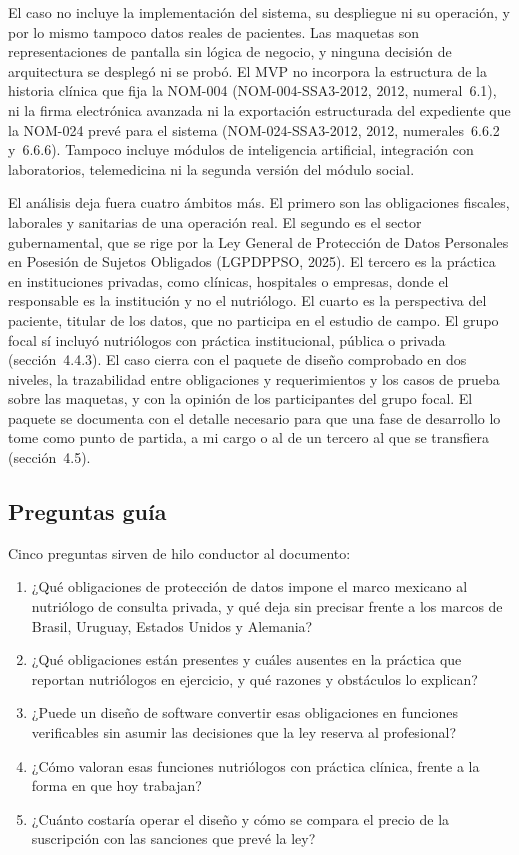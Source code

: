 \documentclass[12pt, a4paper]{article}
\begin{document}
El caso no incluye la implementación del sistema, su despliegue ni su
operación, y por lo mismo tampoco datos reales de pacientes. Las
maquetas son representaciones de pantalla sin lógica de negocio, y
ninguna decisión de arquitectura se desplegó ni se probó. El MVP no
incorpora la estructura de la historia clínica que fija la NOM-004
(NOM-004-SSA3-2012, 2012, numeral~6.1), ni la firma electrónica avanzada
ni la exportación estructurada del expediente que la NOM-024 prevé para
el sistema (NOM-024-SSA3-2012, 2012, numerales~6.6.2 y~6.6.6). Tampoco
incluye módulos de inteligencia artificial, integración con
laboratorios, telemedicina ni la segunda versión del módulo social.
 
El análisis deja fuera cuatro ámbitos más. El primero son las obligaciones
fiscales, laborales y sanitarias de una operación real. El segundo es el
sector gubernamental, que se rige por la Ley General de Protección de
Datos Personales en Posesión de Sujetos Obligados (LGPDPPSO, 2025). El
tercero es la práctica en instituciones privadas, como clínicas,
hospitales o empresas, donde el responsable es la institución y no el
nutriólogo. El cuarto es la perspectiva del paciente, titular de los
datos, que no participa en el estudio de campo. El grupo focal sí incluyó nutriólogos con práctica institucional, pública o privada (sección~4.4.3). El caso cierra con el paquete de
diseño comprobado en dos niveles, la trazabilidad entre obligaciones y
requerimientos y los casos de prueba sobre las maquetas, y con la opinión de
los participantes del grupo focal. El paquete se documenta con el detalle
necesario para que una fase de desarrollo lo tome como punto de partida,
a mi cargo o al de un tercero al que se transfiera (sección~4.5).

\subsection{Preguntas guía}
Cinco preguntas sirven de hilo conductor al documento:
 
\begin{enumerate}
  \item ¿Qué obligaciones de protección de datos impone el marco
    mexicano al nutriólogo de consulta privada, y qué deja sin precisar
    frente a los marcos de Brasil, Uruguay, Estados Unidos y Alemania?
  \item ¿Qué obligaciones están presentes y cuáles ausentes en la
    práctica que reportan nutriólogos en ejercicio, y qué razones y
    obstáculos lo explican?
  \item ¿Puede un diseño de software convertir esas obligaciones en
    funciones verificables sin asumir las decisiones que la ley reserva
    al profesional?
  \item ¿Cómo valoran esas funciones nutriólogos con práctica clínica,
    frente a la forma en que hoy trabajan?
  \item ¿Cuánto costaría operar el diseño y cómo se compara el precio de la suscripción con las sanciones que
    prevé la ley?
\end{enumerate}
\end{document}
